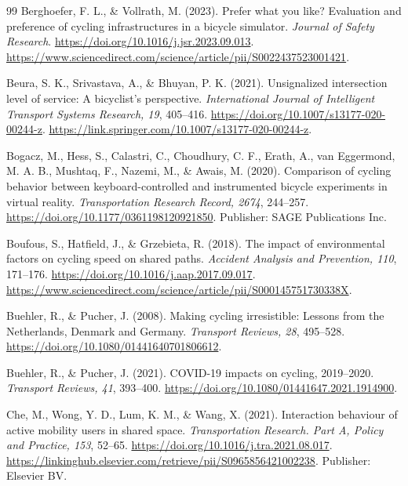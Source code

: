 \begin{thebibliography}{99}
Berghoefer, F. L., \& Vollrath, M. (2023). Prefer what you like? Evaluation and
preference of cycling infrastructures in a bicycle simulator. \emph{Journal of
Safety Research}. \url{https://doi.org/10.1016/j.jsr.2023.09.013}.
\url{https://www.sciencedirect.com/science/article/pii/S0022437523001421}.

Beura, S. K., Srivastava, A., \& Bhuyan, P. K. (2021). Unsignalized intersection
level of service: A bicyclist's perspective. \emph{International Journal of
Intelligent Transport Systems Research, 19}, 405--416.
\url{https://doi.org/10.1007/s13177-020-00244-z}.
\url{https://link.springer.com/10.1007/s13177-020-00244-z}.

Bogacz, M., Hess, S., Calastri, C., Choudhury, C. F., Erath, A., van Eggermond,
M. A. B., Mushtaq, F., Nazemi, M., \& Awais, M. (2020). Comparison of cycling
behavior between keyboard-controlled and instrumented bicycle experiments in
virtual reality. \emph{Transportation Research Record, 2674}, 244--257.
\url{https://doi.org/10.1177/0361198120921850}. Publisher: SAGE Publications
Inc.

Boufous, S., Hatfield, J., \& Grzebieta, R. (2018). The impact of environmental
factors on cycling speed on shared paths. \emph{Accident Analysis and
Prevention, 110}, 171--176. \url{https://doi.org/10.1016/j.aap.2017.09.017}.
\url{https://www.sciencedirect.com/science/article/pii/S000145751730338X}.

Buehler, R., \& Pucher, J. (2008). Making cycling irresistible: Lessons from the
Netherlands, Denmark and Germany. \emph{Transport Reviews, 28}, 495--528.
\url{https://doi.org/10.1080/01441640701806612}.

Buehler, R., \& Pucher, J. (2021). COVID-19 impacts on cycling, 2019--2020.
\emph{Transport Reviews, 41}, 393--400.
\url{https://doi.org/10.1080/01441647.2021.1914900}.

Che, M., Wong, Y. D., Lum, K. M., \& Wang, X. (2021). Interaction behaviour of
active mobility users in shared space. \emph{Transportation Research. Part A,
Policy and Practice, 153}, 52--65.
\url{https://doi.org/10.1016/j.tra.2021.08.017}.
\url{https://linkinghub.elsevier.com/retrieve/pii/S0965856421002238}. Publisher:
Elsevier BV.


\end{thebibliography}
